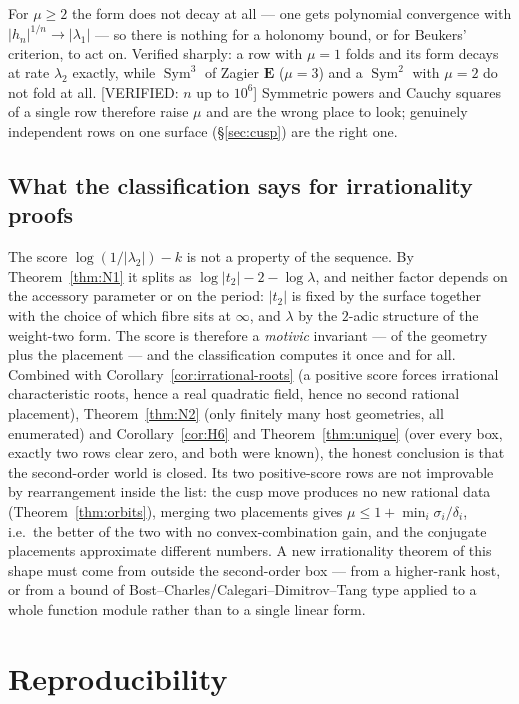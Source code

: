 \documentclass[11pt,reqno]{amsart}
\theoremstyle{plain}
\theoremstyle{definition}
\theoremstyle{remark}
\theoremstyle{plain}
\DeclareMathOperator{\Sym}{Sym}
\newcommand{\VerifiedR}[1]{\textup{\textsf{[VERIFIED: #1]}}}
\begin{document}
For $\mu\ge2$ the form does not decay at all --- one gets polynomial convergence
with $|h_n|^{1/n}\to|\lambda_1|$ --- so there is nothing for a holonomy bound, or
for Beukers' criterion, to act on. Verified sharply: a row with $\mu=1$ folds and
its form decays at rate $\lambda_2$ exactly, while $\Sym^3$ of Zagier $\mathbf E$
($\mu=3$) and a $\Sym^2$ with $\mu=2$ do not fold at all.
\VerifiedR{$n$ up to $10^6$} Symmetric powers and Cauchy squares of a single row
therefore raise $\mu$ and are the wrong place to look; genuinely independent rows
on one surface (\S\ref{sec:cusp}) are the right one.

\subsection*{What the classification says for irrationality proofs}
The score $\log(1/|\lambda_2|)-k$ is not a property of the sequence. By
Theorem~\ref{thm:N1} it splits as $\log|t_2|-2-\log\lambda$, and neither factor
depends on the accessory parameter or on the period: $|t_2|$ is fixed by the
surface together with the choice of which fibre sits at $\infty$, and $\lambda$
by the $2$-adic structure of the weight-two form. The score is therefore a
\emph{motivic} invariant --- of the geometry plus the placement --- and the
classification computes it once and for all. Combined with
Corollary~\ref{cor:irrational-roots} (a positive score forces irrational
characteristic roots, hence a real quadratic field, hence no second rational
placement), Theorem~\ref{thm:N2} (only finitely many host geometries, all
enumerated) and Corollary~\ref{cor:H6} and Theorem~\ref{thm:unique} (over every
box, exactly two rows clear zero, and both were known), the honest conclusion is
that the second-order world is closed. Its two positive-score rows are not
improvable by rearrangement inside the list: the cusp move produces no new
rational data (Theorem~\ref{thm:orbits}), merging two placements gives
$\mu\le1+\min_i\sigma_i/\delta_i$, i.e.\ the better of the two with no
convex-combination gain, and the conjugate placements approximate different
numbers. A new irrationality theorem of this shape must come from outside the
second-order box --- from a higher-rank host, or from a bound of
Bost--Charles/Calegari--Dimitrov--Tang type applied to a whole function module
rather than to a single linear form.

\section{Reproducibility}\label{sec:repro}
\end{document}
